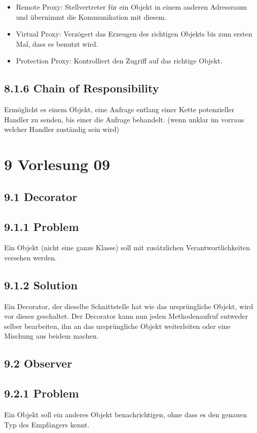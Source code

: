 \begin{itemize}
  \item Remote Proxy: Stellvertreter für ein Objekt in einem anderen Adressraum und übernimmt die Kommunikation mit diesem.
  \item Virtual Proxy: Verzögert das Erzeugen des richtigen Objekts bis zum ersten Mal, dass es benutzt wird.
  \item Protection Proxy: Kontrolliert den Zugriff auf das richtige Objekt.
\end{itemize}

\subsection*{8.1.6 Chain of Responsibility}
Ermöglicht es einem Objekt, eine Anfrage entlang einer Kette potenzieller Handler zu senden, bis einer die Anfrage behandelt. (wenn unklar im vorraus welcher Handler zuständig sein wird)

\section*{9 Vorlesung 09}
\subsection*{9.1 Decorator}
\subsection*{9.1.1 Problem}
Ein Objekt (nicht eine ganze Klasse) soll mit zusätzlichen Verantwortlichkeiten versehen werden.

\subsection*{9.1.2 Solution}
Ein Decorator, der dieselbe Schnittstelle hat wie das ursprüngliche Objekt, wird vor dieses geschaltet. Der Decorator kann nun jeden Methodenaufruf entweder selber bearbeiten, ihn an das ursprüngliche Objekt weiterleiten oder eine Mischung aus beidem machen.

\subsection*{9.2 Observer}
\subsection*{9.2.1 Problem}
Ein Objekt soll ein anderes Objekt benachrichtigen, ohne dass es den genauen Typ des Empfängers kennt.

